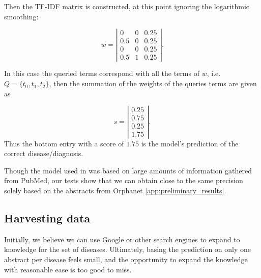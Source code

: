 \documentclass[10pt,letterpaper,two column,final]{article}
\begin{document}
Then the TF-IDF matrix is constructed, at this point ignoring the
logarithmic smoothing:

\[ w = \left| \begin{array}{ccc}
0 & 0 & 0.25 \\
0.5 & 0 & 0.25 \\
0 & 0 & 0.25 \\
0.5 & 1 & 0.25  \end{array} \right|.
\]

In this case the queried terms correspond with all the terms of
$w$, i.e. $Q = \{t_{0}, t_{1}, t_{2}\}$, then the summation of the
weights of the queries terms are given as

\[ s = \left| \begin{array}{c}
0.25 \\
0.75 \\
0.25 \\
1.75 \end{array} \right|.
\]
Thus the bottom entry with a score of $1.75$ is the model's prediction
of the correct disease/diagnosis. \newline

Though the model used in \cite{jensenandersen} was based on large
amounts of information gathered from PubMed, our tests show that we
can obtain close to the same precision solely based on the abstracts
from Orphanet \ref{app:preliminary_results}.



\subsection{Harvesting data}
Initially, we believe we can use Google or other search engines to
expand to knowledge for the set of diseases. Ultimately, basing the
prediction on only one abstract per disease feels small, and the
opportunity to expand the knowledge with reasonable ease is too good to
miss.
\end{document}
